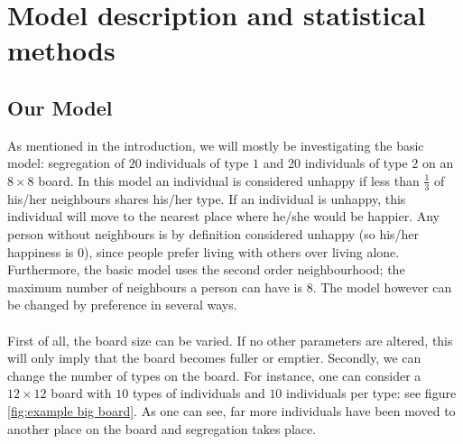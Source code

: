 \section{Model description and statistical methods}
\subsection{Our Model}
As mentioned in the introduction, we will mostly be investigating the basic model: segregation of $20$ individuals of type $1$ and $20$ individuals of type $2$ on an $8 \times 8$ board.
In this model an individual is considered unhappy if less than \(\frac{1}{3}\) of his/her neighbours shares his/her type. If an individual is unhappy, this individual will move to the nearest place where he/she would be happier.
Any person without neighbours is by definition considered unhappy (so his/her happiness is $0$), since people prefer living with others over living alone.
Furthermore, the basic model uses the second order neighbourhood; the maximum number of neighbours a person can have is 8. 
The model however can be changed by preference in several ways.\\
\\
First of all, the board size can be varied.
If no other parameters are altered, this will only imply that the board becomes fuller or emptier.
Secondly, we can change the number of types on the board.
For instance, one can consider a $12\times 12$ board with $10$ types of individuals and $10$ individuals per type: see figure \ref{fig:example big board}.
As one can see, far more individuals have been moved to another place on the board and segregation takes place.

